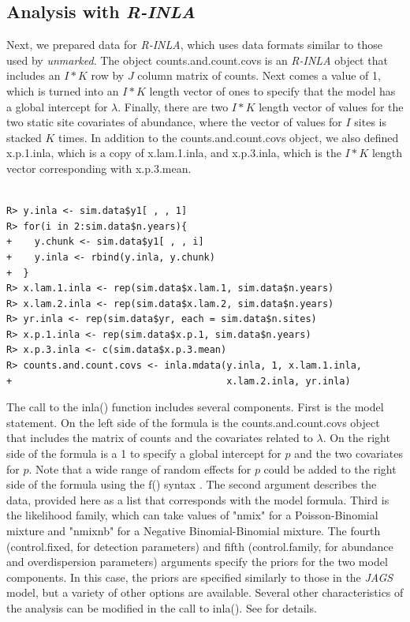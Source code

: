 \documentclass{article}
\begin{document}
\subsection[Analysis with R-INLA]{Analysis with \emph{R-INLA}}
Next, we prepared data for \emph{R-INLA}, which uses data formats similar to those used by \emph{unmarked}. The object counts.and.count.covs is an \emph{R-INLA} object that includes an $I*K$ row by $J$ column matrix of counts. Next comes a value of 1, which is turned into an $I*K$ length vector of ones to specify that the model has a global intercept for $\lambda$. Finally, there are two $I*K$ length vector of values for the two static site covariates of abundance, where the vector of values for $I$ sites is stacked $K$ times. In addition to the counts.and.count.covs object, we also defined x.p.1.inla, which is a copy of x.lam.1.inla, and x.p.3.inla, which is the $I*K$ length vector corresponding with x.p.3.mean.

\begin{verbatim}

R> y.inla <- sim.data$y1[ , , 1]
R> for(i in 2:sim.data$n.years){
+    y.chunk <- sim.data$y1[ , , i]
+    y.inla <- rbind(y.inla, y.chunk)
+  }
R> x.lam.1.inla <- rep(sim.data$x.lam.1, sim.data$n.years)
R> x.lam.2.inla <- rep(sim.data$x.lam.2, sim.data$n.years)
R> yr.inla <- rep(sim.data$yr, each = sim.data$n.sites)
R> x.p.1.inla <- rep(sim.data$x.p.1, sim.data$n.years)
R> x.p.3.inla <- c(sim.data$x.p.3.mean)
R> counts.and.count.covs <- inla.mdata(y.inla, 1, x.lam.1.inla, 
+                                      x.lam.2.inla, yr.inla)
\end{verbatim}

The call to the inla() function includes several components. First is the model statement. On the left side of the formula is the counts.and.count.covs object that includes the matrix of counts and the covariates related to $\lambda$.  On the right side of the formula is a 1 to specify a global intercept for $p$ and the two covariates for $p$.  Note that a wide range of random effects for $p$ could be added to the right side of the formula using the f() syntax \citep{Rue_Riebler_Sorbye_Illian_Simpson_Lindgren_2017}. The second argument describes the data, provided here as a list that corresponds with the model formula. Third is the likelihood family, which can take values of "nmix" for a Poisson-Binomial mixture and "nmixnb" for a Negative Binomial-Binomial mixture. The fourth (control.fixed, for detection parameters) and fifth (control.family, for abundance and overdispersion parameters) arguments specify the priors for the two model components. In this case, the priors are specified similarly to those in the \emph{JAGS} model, but a variety of other options are available. Several other characteristics of the analysis can be modified in the call to inla(). See \cite{Rue_Riebler_Sorbye_Illian_Simpson_Lindgren_2017} for details.
\end{document}

